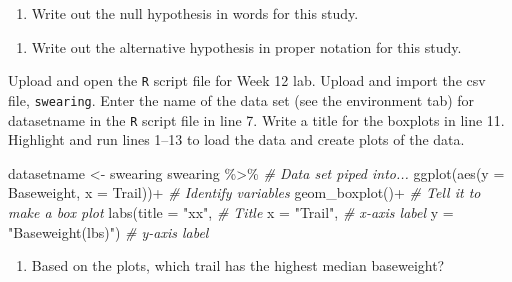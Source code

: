 \documentclass[
]{report}
\newenvironment{Shaded}{\begin{snugshade}}{\end{snugshade}}
\newcommand{\AttributeTok}[1]{\textcolor[rgb]{0.77,0.63,0.00}{#1}}
\newcommand{\CommentTok}[1]{\textcolor[rgb]{0.56,0.35,0.01}{\textit{#1}}}
\newcommand{\FunctionTok}[1]{\textcolor[rgb]{0.00,0.00,0.00}{#1}}
\newcommand{\NormalTok}[1]{#1}
\newcommand{\OtherTok}[1]{\textcolor[rgb]{0.56,0.35,0.01}{#1}}
\newcommand{\SpecialCharTok}[1]{\textcolor[rgb]{0.00,0.00,0.00}{#1}}
\newcommand{\StringTok}[1]{\textcolor[rgb]{0.31,0.60,0.02}{#1}}
\providecommand{\tightlist}{%
  \setlength{\itemsep}{0pt}\setlength{\parskip}{0pt}}
\begin{document}
\vspace{0.8in}

\begin{enumerate}
\def\labelenumi{\arabic{enumi}.}
\setcounter{enumi}{4}
\tightlist
\item
  Write out the null hypothesis in words for this study.
\end{enumerate}

\vspace{0.8in}

\begin{enumerate}
\def\labelenumi{\arabic{enumi}.}
\setcounter{enumi}{4}
\tightlist
\item
  Write out the alternative hypothesis in proper notation for this study.
\end{enumerate}

\vspace{0.5in}

Upload and open the \texttt{R} script file for Week 12 lab. Upload and import the csv file, \texttt{swearing}. Enter the name of the data set (see the environment tab) for datasetname in the \texttt{R} script file in line 7. Write a title for the boxplots in line 11. Highlight and run lines 1--13 to load the data and create plots of the data.

\begin{Shaded}
\begin{Highlighting}[]
\NormalTok{datasetname }\OtherTok{\textless{}{-}}\NormalTok{ swearing }
\NormalTok{swearing }\SpecialCharTok{\%\textgreater{}\%}  \CommentTok{\# Data set piped into...}
  \FunctionTok{ggplot}\NormalTok{(}\FunctionTok{aes}\NormalTok{(}\AttributeTok{y =}\NormalTok{ Baseweight, }\AttributeTok{x =}\NormalTok{ Trail))}\SpecialCharTok{+}  \CommentTok{\# Identify variables}
  \FunctionTok{geom\_boxplot}\NormalTok{()}\SpecialCharTok{+}  \CommentTok{\# Tell it to make a box plot}
  \FunctionTok{labs}\NormalTok{(}\AttributeTok{title =} \StringTok{"xx"}\NormalTok{,  }\CommentTok{\# Title}
       \AttributeTok{x =} \StringTok{"Trail"}\NormalTok{,    }\CommentTok{\# x{-}axis label}
       \AttributeTok{y =} \StringTok{"Baseweight(lbs)"}\NormalTok{)  }\CommentTok{\# y{-}axis label}
\end{Highlighting}
\end{Shaded}

\begin{enumerate}
\def\labelenumi{\arabic{enumi}.}
\setcounter{enumi}{5}
\tightlist
\item
  Based on the plots, which trail has the highest median baseweight?
  \vspace{0.2in}
\end{enumerate}
\end{document}
